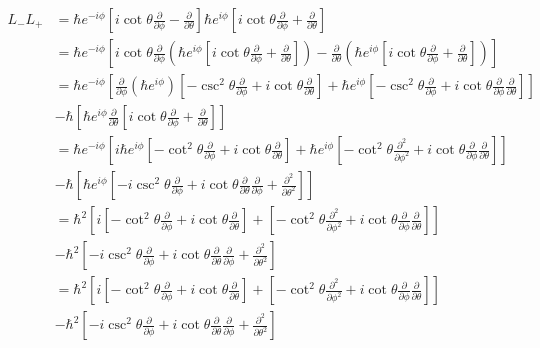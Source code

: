 \documentclass[letter, 10pts]{article}
\newcommand{\hb}{\hbar}
\begin{document}
\begin{align*}
L_- 
L_+ 
&= 
\hb e^{-i \phi} 
\left[
i \cot \theta \frac{\partial }{\partial \phi} - 
\frac{\partial }{\partial \theta} 
\right] 
\hb e^{ i \phi} 
\left[
i \cot \theta \frac{\partial }{\partial \phi} +
\frac{\partial }{\partial \theta} 
\right]   \\ 
&= 
\hb e^{-i \phi} 
\left[
i \cot \theta \frac{\partial }{\partial \phi} 
\left(
\hb e^{ i \phi} 
\left[
i \cot \theta \frac{\partial }{\partial \phi} +
\frac{\partial }{\partial \theta} 
\right]   
	\right)
- 
\frac{\partial }{\partial \theta} 
\left(
\hb e^{ i \phi} 
\left[
	i \cot \theta \frac{\partial }{\partial \phi} +
\frac{\partial }{\partial \theta} 
\right]   
\right)
\right]  
\\
&=
\hb e^{-i \phi} 
\left[
\frac{\partial }{\partial \phi} 
\left(
\hb e^{ i \phi} 
\right) 
\left[
-  \csc^2 \theta \frac{\partial }{\partial \phi} +
i \cot \theta 
\frac{\partial }{\partial \theta} 
\right]   
+ 
\hb e^{ i \phi } 
\left[
- \csc ^2 \theta \frac{\partial}{\partial \phi }
+ i \cot \theta \frac{\partial}{\partial \phi} \frac{\partial }{ \partial \theta}
\right] \right]  \\ 
& - \hb 
\left[
\hb e^{ i \phi} 
\frac{\partial }{\partial \theta} 
\left[
i \cot \theta \frac{\partial }{\partial \phi} +
\frac{\partial }{\partial \theta} 
\right]   
\right]  
\\
&= 
\hb e^{-i \phi} 
\left[
i \hb e^{ i \phi} 
\left[
-  \cot^2 \theta \frac{\partial }{\partial \phi} +
i \cot \theta 
\frac{\partial }{\partial \theta} 
\right]   
+ 
\hb e^{ i \phi } 
\left[
- \cot^2 \theta \frac{\partial^2}{\partial \phi ^2}
+ i \cot \theta \frac{\partial}{\partial \phi} \frac{\partial }{ \partial \theta}
\right] \right]  \\ 
& - 
\hb \left[
\hb e^{ i \phi} 
\left[
- i \csc ^2 \theta \frac{\partial }{\partial \phi} +
i \cot \theta \frac{\partial }{ \partial \theta } \frac{\partial }{ \partial \phi }
+ \frac{\partial ^2 }{\partial \theta^2 }
\right]   
\right]  
\\
&= 
\hb^2 
\left[
i 
\left[
-  \cot^2 \theta \frac{\partial }{\partial \phi} +
i \cot \theta 
\frac{\partial }{\partial \theta} 
\right]   
+ 
\left[
- \cot^2 \theta \frac{\partial^2}{\partial \phi ^2}
+ i \cot \theta \frac{\partial}{\partial \phi} \frac{\partial }{ \partial \theta}
\right] \right]  \\ 
& - 
\hb^2 \left[
- i \csc ^2 \theta \frac{\partial }{\partial \phi} +
i \cot \theta \frac{\partial }{ \partial \theta } \frac{\partial }{ \partial \phi }
+ \frac{\partial ^2 }{\partial \theta^2 }
\right]   
\\
&= 
\hb^2 
\left[
i 
\left[
-  \cot^2 \theta \frac{\partial }{\partial \phi} +
i \cot \theta 
\frac{\partial }{\partial \theta} 
\right]   
+ 
\left[
- \cot^2 \theta \frac{\partial^2}{\partial \phi ^2}
+ i \cot \theta \frac{\partial}{\partial \phi} \frac{\partial }{ \partial \theta}
\right] \right]  \\ 
& - 
\hb^2 \left[
- i \csc ^2 \theta \frac{\partial }{\partial \phi} +
i \cot \theta \frac{\partial }{ \partial \theta } \frac{\partial }{ \partial \phi }
+ \frac{\partial ^2 }{\partial \theta^2 }
\right]   
\end{align*} 
\end{document}
